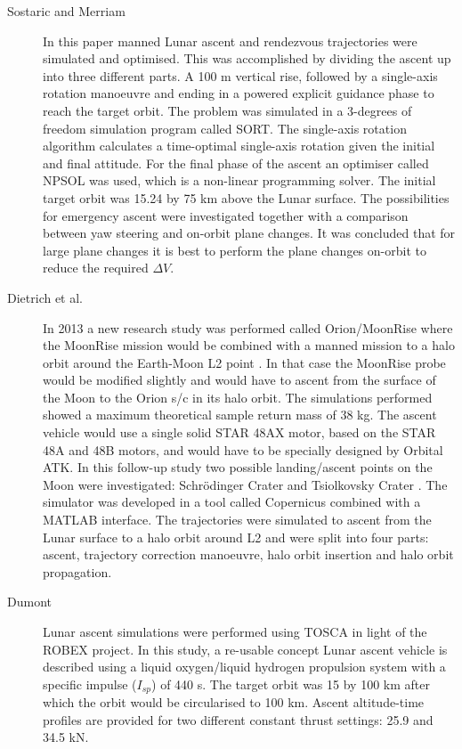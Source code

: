 \begin{description}
\item[Sostaric and Merriam \cite{sostaric2008lunar}]In this paper manned Lunar ascent and rendezvous trajectories were simulated and optimised. This was accomplished by dividing the ascent up into three different parts. A 100 m vertical rise, followed by a single-axis rotation manoeuvre and ending in a powered explicit guidance phase to reach the target orbit. The problem was simulated in a 3-degrees of freedom simulation program called SORT. The single-axis rotation algorithm calculates a time-optimal single-axis rotation given the initial and final attitude. For the final phase of the ascent an optimiser called NPSOL was used, which is a non-linear programming solver. The initial target orbit was 15.24 by 75 km above the Lunar surface. The possibilities for emergency ascent were investigated together with a comparison between yaw steering and on-orbit plane changes. It was concluded that for large plane changes it is best to perform the plane changes on-orbit to reduce the required $\Delta V$.
\item[Dietrich et al. \cite{dietrich2015ascent}]In 2013 a new research study was performed called Orion/MoonRise where the MoonRise mission would be combined with a manned mission to a halo orbit around the Earth-Moon L2 point \cite{alkalai2013orion}. In that case the MoonRise probe would be modified slightly and would have to ascent from the surface of the Moon to the Orion \ac{s/c} in its halo orbit. The simulations performed showed a maximum theoretical sample return mass of 38 kg. The ascent vehicle would use a single solid STAR 48AX motor, based on the STAR 48A and 48B motors, and would have to be specially designed by Orbital ATK. In this follow-up study two possible landing/ascent points on the Moon were investigated: Schr\"{o}dinger Crater and Tsiolkovsky Crater \cite{dietrich2015ascent}. The simulator was developed in a tool called Copernicus combined with a MATLAB interface. The trajectories were simulated to ascent from the Lunar surface to a halo orbit around L2 and were split into four parts: ascent, trajectory correction manoeuvre, halo orbit insertion and halo orbit propagation.
\item[Dumont \cite{dumont2015design}] Lunar ascent simulations were performed using \ac{TOSCA} in light of the ROBEX project. In this study, a re-usable concept Lunar ascent vehicle is described using a liquid oxygen/liquid hydrogen propulsion system with a specific impulse ($I_{sp}$) of 440 s. The target orbit was 15 by 100 km after which the orbit would be circularised to 100 km. Ascent altitude-time profiles are provided for two different constant thrust settings: 25.9 and 34.5 kN.
\end{description}


